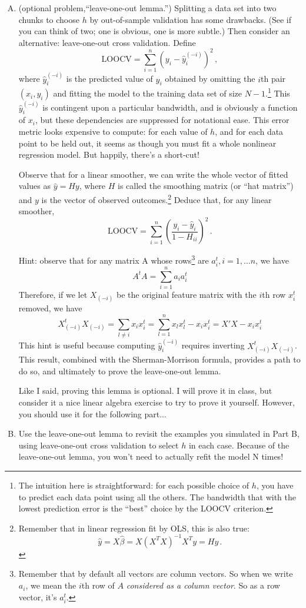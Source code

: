 \documentclass[11pt]{article}
\begin{document}
\begin{enumerate}[(A)]
\item (optional problem,``leave-one-out lemma.'') Splitting a data set into two chunks to choose $h$ by out-of-sample validation has some drawbacks.  (See if you can think of two; one is obvious, one is more subtle.)  Then consider an alternative: leave-one-out cross validation.  Define
$$
\mbox{LOOCV} = \sum_{i=1}^n \left( y_i - \hat{y}_{i}^{(-i)} \right)^2 \, ,
$$
where $\hat{y}_{i}^{(-i)} $ is the predicted value of $y_i$ obtained by omitting the $i$th pair $(x_i, y_i)$ and fitting the model to the training data set of size $N-1$.\footnote{The intuition here is straightforward: for each possible choice of $h$, you have to predict each data point using all the others.  The bandwidth that with the lowest prediction error is the ``best'' choice by the LOOCV criterion.}  This $\hat{y}_{i}^{(-i)}$ is contingent upon a particular bandwidth, and is obviously a function of $x_i$, but these dependencies are suppressed for notational ease.  This error metric looks expensive to compute: for each value of $h$, and for each data point to be held out, it seems as though you must fit a whole nonlinear regression model.  But happily, there's a short-cut!

Observe that for a linear smoother, we can write the whole vector of fitted values as $\hat{y} = H y$, where $H$ is called the smoothing matrix (or ``hat matrix'') and $y$ is the vector of observed outcomes.\footnote{Remember that in linear regression fit by OLS, this is also true: $$\hat{y} = X \hat{\beta} = X (X^T X)^{-1} X^T y = Hy \, .$$}   Deduce that, for any linear smoother,
$$
\mbox{LOOCV} = \sum_{i=1}^n \left( \frac{  y_i - \hat{y}_{i} } {1-H_{ii}} \right)^2 \, .
$$

Hint: observe that for any matrix A whose rows\footnote{Remember that by default all vectors are column vectors. So when we write $a_i$, we mean the $i$th row of $A$ \emph{considered as a column vector}.  So as a row vector, it's $a_i^t$.} are $a_i^t, i = 1, \ldots n$, we have
$$
A^t A = \sum_{i=1}^n a_i a_i^t
$$
Therefore, if we let $X_{(-i)}$ be the original feature matrix with the $i$th row $x_i^t$ removed, we have
$$
X_{(-i)}^t X_{(-i)} = \sum_{l \neq i} x_i x_i^t = \sum_{l=1}^n x_l x_l^t  - x_i x_i^t = X'X - x_i x_i^t
$$
 This hint is useful because computing $\hat{y}_{i}^{(-i)}$ requires inverting $X_{(-i)}^t X_{(-i)}$.  This result, combined with the Sherman-Morrison formula, provides a path to do so, and ultimately to prove the leave-one-out lemma.  

Like I said, proving this lemma is optional. I will prove it in class, but consider it a nice linear algebra exercise to try to prove it yourself.  However, you should use it for the following part...

\item Use the leave-one-out lemma to revisit the examples you simulated in Part B, using leave-one-out cross validation to select $h$ in each case.  Because of the leave-one-out lemma, you won't need to actually refit the model N times!  



\end{enumerate}
\end{document}
